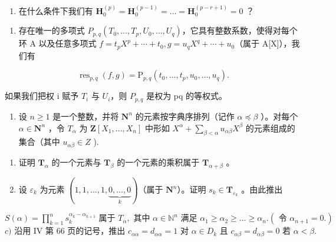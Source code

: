 \begin{enumerate}
\def\labelenumi{\alph{enumi})}
\setcounter{enumi}{1}
\tightlist
\item
  在什么条件下我们有 \(\mathbf{H}_0^{(p)} = \mathbf{H}_0^{(p - 1)} = \ldots = \mathbf{H}_0^{(p - r + 1)} = 0\) ？
\end{enumerate}

\begin{enumerate}
\def\labelenumi{\arabic{enumi})}
\setcounter{enumi}{11}
\tightlist
\item
  存在唯一的多项式 \(P_{p,q}(T_{0},\ldots,T_{p},U_{0},\ldots,U_{q})\)，它具有整数系数，使得对每个环 A 以及任意多项式 \(f=t_{p}X^{p}+\cdots+t_{0}, g=u_{q}X^{q}+\cdots+u_{0}\)（属于 A{[}X{]}），我们有
\end{enumerate}

\[
\operatorname{res} _ {p, q} (f, g) = \mathrm{P} _ {p, q} \left(t _ {0}, \dots , t _ {p}, u _ {0}, \dots , u _ {q}\right).
\]

如果我们把权 i 赋予 \(T_{i}\) 与 \(U_{i}\)，则 \(P_{p,q}\) 是权为 pq 的等权式。

\begin{enumerate}
\def\labelenumi{\arabic{enumi})}
\setcounter{enumi}{12}
\tightlist
\item
  设 \(n \geqslant 1\) 是一个整数，并将 \(\mathbf{N}^n\) 的元素按字典序排列（记作 \(\alpha \preccurlyeq \beta\) ）。对每个 \(\alpha \in \mathbf{N}^n\) ，令 \(T_{\alpha}\) 为 \(\mathbf{Z}[X_1, \ldots, X_n]\) 中形如 \(X^{\alpha} + \sum_{\beta < \alpha} u_{\alpha\beta} X^{\beta}\) 的元素组成的集合（其中 \(u_{\alpha\beta} \in Z\) ).
\end{enumerate}

\begin{enumerate}
\def\labelenumi{\alph{enumi})}
\tightlist
\item
  证明 \(\mathbf{T}_{\alpha}\) 的一个元素与 \(\mathbf{T}_{\beta}\) 的一个元素的乘积属于 \(\mathbf{T}_{\alpha + \beta}\) 。\\
\item
  设 \(\varepsilon_{k}\) 为元素 \((1, 1, \ldots, 1, \underbrace{0, \ldots, 0}_{k})\)（属于 \(\mathbf{N}^{n}\)）。证明 \(s_{k} \in \mathbf{T}_{\varepsilon_{k}}\) 。由此推出
\end{enumerate}

\(S(\alpha) = \prod_{k=1}^{n} s_k^{\alpha_k - \alpha_{k+1}} \text{ 属于 } T_\alpha, \text{ 其中 } \alpha \in \mathbb{N}^n \text{ 满足 } \alpha_1 \geqslant \alpha_2 \geqslant \ldots \geqslant \alpha_n. (\text{ 令 } \alpha_{n+1} = 0.)\) \(c) \text{ 沿用 IV 第 66 页的记号，推出 } c_{\alpha\alpha} = d_{\alpha\alpha} = 1 \text{ 对 } \alpha \in D_k \text{ 且 } c_{\alpha\beta} = d_{\alpha\beta} = 0 \text{ 若 } \alpha < \beta.\)

